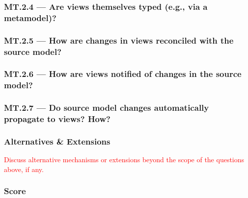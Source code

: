 \documentclass[sigconf,review]{acmart}
\begin{document}


\subsubsection*{MT.2.4 --- Are views themselves typed (e.g., via a metamodel)?}
\label{sec:MT2-4}



\subsubsection*{MT.2.5 --- How are changes in views reconciled with the source model?}
\label{sec:MT2-5}



\subsubsection*{MT.2.6 --- How are views notified of changes in the source model?}
\label{sec:MT2-6}



\subsubsection*{MT.2.7 --- Do source model changes automatically propagate to views? How?}
\label{sec:MT2-7}



\subsubsection*{Alternatives \& Extensions}
\label{sec:MT2-Alternatives-Extensions}

\textcolor{red}{Discuss alternative mechanisms or extensions beyond the 
scope of the questions above, if any.}

\subsubsection*{Score}
\label{sec:MT2-Score}



\end{document}
